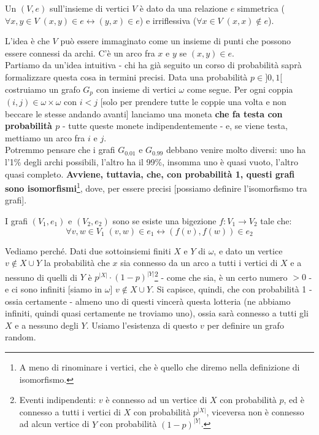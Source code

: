 \documentclass[11pt]{scrartcl}
\begin{document}
\begin{definition}[Grafo]
	Un  $(V,e)$ sull'insieme di vertici $V$ è dato da una relazione $e$ simmetrica ($\forall x,y \in V \; (x,y) \in e \leftrightarrow (y,x) \in e$) e 
	irriflessiva ($\forall x \in V \; (x,x) \not\in e$).
\end{definition}

L'idea è che $V$ può essere immaginato come un insieme di punti che possono essere connessi da archi. C'è un arco fra $x$ e $y$ se $(x,y) \in e$.\\
%
Partiamo da un'idea intuitiva -  chi ha già seguito un corso di probabilità saprà formalizzare questa cosa in termini precisi. Data una probabilità $p \in ]0,1[$ costruiamo un grafo
$G_p$ con insieme di vertici $\omega$ come segue. Per ogni coppia $(i,j) \in \omega \times \omega$ con $i < j$ [solo per prendere tutte le coppie una volta e non beccare le stesse andando avanti] lanciamo una moneta \textbf{che fa testa con probabilità $p$} - tutte queste monete indipendentemente - e, se viene testa, mettiamo un arco 
fra $i$ e $j$.\\
Potremmo pensare che i grafi $G_{0.01}$ e $G_{0.99}$ debbano venire molto diversi: uno ha l'1\% degli archi possibili, l'altro ha il 99\%, insomma uno è quasi vuoto, l'altro quasi completo. \textbf{Avviene, tuttavia, che, con probabilità 1, questi grafi sono isomorfismi}\footnote{A meno di rinominare i vertici, che è quello che diremo nella definizione di isomorfismo.}, dove, per essere precisi
[possiamo definire l'isomorfismo tra grafi].

\begin{definition}
	I grafi $(V_1,e_1)$ e $(V_2,e_2)$ sono  se esiste una bigezione $f : V_1 \rightarrow V_2$ tale che:
	\[ \forall v,w \in V_1 \; (v,w) \in e_1 \longleftrightarrow (f(v),f(w)) \in e_2
		\]
\end{definition}

Vediamo perché. Dati due sottoinsiemi finiti $X$ e $Y$ di $\omega$, e dato un vertice $v \not \in X \cup Y$ la probabilità che $x$ sia connesso da un arco a tutti i vertici di $X$ e a nessuno di quelli di $Y$
è $p^{|X|} \cdot (1 - p)^{|Y|}$\footnote{Eventi indipendenti: $v$ è connesso ad un vertice di $X$ con probabilità $p$, ed è connesso a tutti i vertici di $X$ con probabilità $p^{|X|}$, viceversa non è connesso ad alcun vertice di $Y$ con
probabilità $(1-p)^{|Y|}$.} - come che sia, è un certo numero $>0$ - e ci sono infiniti [siamo in $\omega$] $v \not \in X \cup Y$. Si capisce, quindi, che con probabilità 1 - ossia certamente - almeno uno di questi vincerà questa lotteria (ne abbiamo infiniti, quindi quasi certamente ne troviamo uno), ossia sarà connesso 
a tutti gli $X$ e a nessuno degli $Y$. Usiamo l'esistenza di questo $v$ per definire un grafo random.
\end{document}
